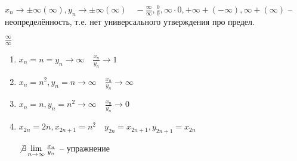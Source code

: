 \begin{note}

    $x_{n} \to \pm \infty (\infty ), y_{n} \to \pm \infty (\infty )\quad -\frac{\infty }{\infty }, \frac{0}{0}, \infty \cdot 0, +\infty +(-\infty ), \infty +(\infty )$ -- неопределённость, т.е. нет универсального утверждения про предел.
\end{note}
\begin{example}
    $\frac{\infty }{\infty }$

    \begin{enumerate}
        \item $x_{n} =n=y_{n} \to \infty  \quad \frac{x_{n} }{y_{n} } \to 1$
        \item $x_{n} =n^2, y_{n} =n \to \infty\quad \frac{x_{n} }{y_{n} } \to \infty  $
        \item $x_{n} =n, y_{n} =n^2 \to \infty \quad \frac{x_{n} }{y_{n} } \to  0$
        \item $x_{2n}=2n, x_{2n+1} = n^2\quad y_{2n} = x_{2n+1}, y_{2n+1} = x_{2n}$

            $\not \exists \lim_{n \to \infty} \frac{x_{n} }{y_{n} } $ -- упражнение
    \end{enumerate}
\end{example}


